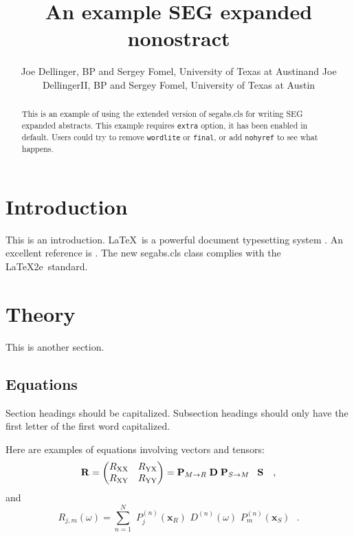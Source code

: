 \documentclass[wordlite,texlive,final,calfont]{segabs}
\newcommand{\rs}[1]{\mathstrut\mbox{\scriptsize\rm #1}}
\begin{document}
\title{An example SEG expanded nonostract}

\renewcommand{\thefootnote}{\fnsymbol{footnote}} 

\author{Joe Dellinger\footnotemark[1], BP 
  and Sergey Fomel, University of Texas at Austin\footnotemark[2] and Joe DellingerII\footnotemark[1], BP 
  and Sergey Fomel, University of Texas at Austin}


\maketitle

\begin{abstract}
  This is an example of using the extended version of \textsf{segabs.cls} for writing
  SEG expanded abstracts. This example requires \texttt{extra} option, it has been enabled in default. Users could try to remove \texttt{wordlite} or \texttt{final}, or add \texttt{nohyref} to see what happens.
\end{abstract}

\section{Introduction}

This is an introduction. \LaTeX\ is a powerful document typesetting
system \cite[]{lamport}. An excellent reference is \cite[]{kopka}. The
new \textsf{segabs.cls} class complies with the \LaTeX2e\ standard.

\section*{Theory}

This is another section. 

\subsection{Equations}

Section headings should be capitalized. Subsection headings should
only have the first letter of the first word capitalized.

Here are examples of equations involving vectors and tensors:
\begin{equation}
\tensor{R} = 
\begin{pmatrix}
  R_{\rs{XX}} & R_{\rs{YX}} \cr R_{\rs{XY}} & R_{\rs{YY}}
\end{pmatrix}
=
\tensor{P}_{M\rightarrow R} \; \tensor{D} \; \tensor{P}_{S\rightarrow M}
\;\;\; \tensor{S} \ \ \  ,
\label{SVD}
\end{equation}
and
\begin{equation}
R_{j,m}(\omega) =
\sum_{n=1}^{N} \, \,
P_{j}^{(n)}(\mathbf{x}_R) \, \,
D^{(n)}(\omega) \, \,
P_{m}^{(n)}(\mathbf{x}_S) \ \ \ .
\label{SVDray}
\end{equation}
\end{document}
